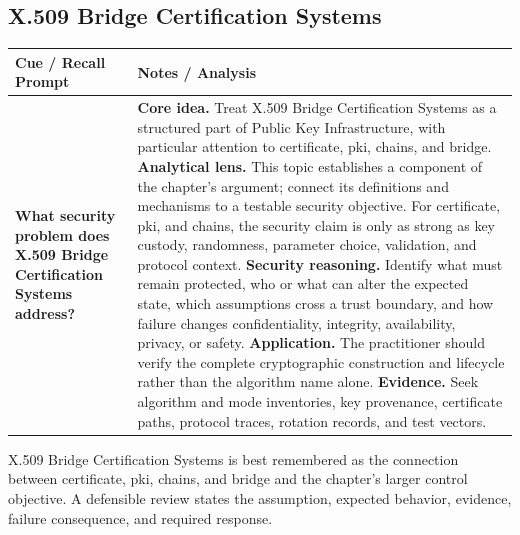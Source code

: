 \documentclass[11pt]{article}
\newcommand{\CornellHeader}{%
\rowcolor{Navy}\color{white}\bfseries Cue / Recall Prompt & \color{white}\bfseries Notes / Analysis\\\hline}
\newcommand{\CornellRow}[2]{%
\cellcolor{CueGray}\RaggedRight\textbf{#1} & \RaggedRight #2\\\hline}
\begin{document}
\subsection*{X.509 Bridge Certification Systems}
\begin{longtable}{>{\RaggedRight\arraybackslash}p{}|>{\RaggedRight\arraybackslash}p{}}
\CornellHeader
\CornellRow{What security problem does X.509 Bridge Certification Systems address?}{\textbf{Core idea.} Treat X.509 Bridge Certification Systems as a structured part of Public Key Infrastructure, with particular attention to certificate, pki, chains, and bridge. \textbf{Analytical lens.} This topic establishes a component of the chapter's argument; connect its definitions and mechanisms to a testable security objective. For certificate, pki, and chains, the security claim is only as strong as key custody, randomness, parameter choice, validation, and protocol context. \textbf{Security reasoning.} Identify what must remain protected, who or what can alter the expected state, which assumptions cross a trust boundary, and how failure changes confidentiality, integrity, availability, privacy, or safety. \textbf{Application.} The practitioner should verify the complete cryptographic construction and lifecycle rather than the algorithm name alone. \textbf{Evidence.} Seek algorithm and mode inventories, key provenance, certificate paths, protocol traces, rotation records, and test vectors.}
\end{longtable}
\begin{topicsummary}
X.509 Bridge Certification Systems is best remembered as the connection between certificate, pki, chains, and bridge and the chapter's larger control objective. A defensible review states the assumption, expected behavior, evidence, failure consequence, and required response.
\end{topicsummary}
\end{document}
